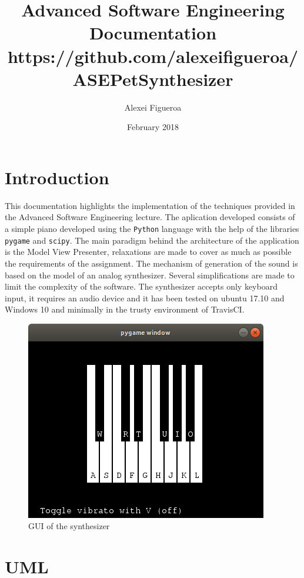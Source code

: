 \documentclass[margin,line,a4paper,authoryear,12pt]{report}
\begin{document}
\title{Advanced Software Engineering Documentation https://github.com/alexeifigueroa/ASEPetSynthesizer}
\author{Alexei Figueroa}
\date{February 2018}
\maketitle

\tableofcontents
\chapter{Introduction}
This documentation highlights the implementation of the techniques 
provided in the Advanced Software Engineering lecture. The aplication developed
consists of a simple piano developed using the \texttt{Python} language with the help
of the libraries \texttt{pygame} and \texttt{scipy}. The main paradigm behind the
architecture of the application is the Model View Presenter, relaxations are made
to cover as much as possible the requirements of the assignment. The mechanism of generation of the sound is based on the model of an
analog synthesizer. Several simplifications are made to limit the complexity of the software. The synthesizer accepts only keyboard input, 
it requires an audio device and it has been tested on ubuntu 17.10 and Windows 10 and minimally in the trusty environment of TravisCI.
\begin{figure}[h!]
    \centering
    \includegraphics[width=0.6\linewidth]{Synthesizer.png}
    \caption{GUI of the synthesizer}
    \label{fig:synthesizer}
\end{figure}    
\chapter{UML}
\end{document}
